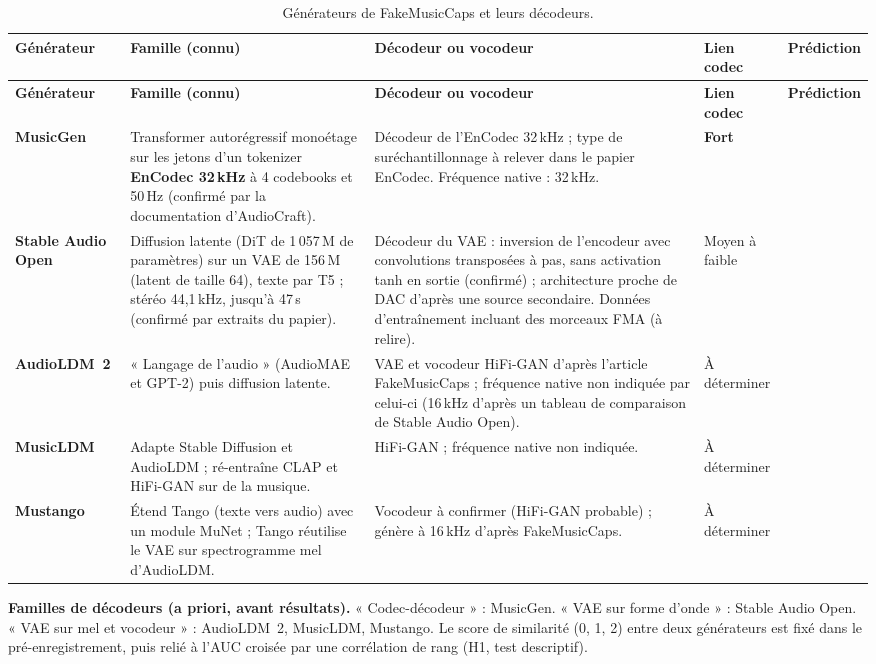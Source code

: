 \documentclass[11pt,a4paper]{article}
\begin{document}
{\small
\begin{longtable}{L{2.2cm}L{4.4cm}L{4.5cm}L{1.7cm}L{1.9cm}}
\caption{Générateurs de FakeMusicCaps et leurs décodeurs.}\label{tab:generateurs}\\
\toprule
\textbf{Générateur} & \textbf{Famille (connu)} & \textbf{Décodeur ou vocodeur} & \textbf{Lien codec} & \textbf{Prédiction}\\
\midrule
\endfirsthead
\toprule
\textbf{Générateur} & \textbf{Famille (connu)} & \textbf{Décodeur ou vocodeur} & \textbf{Lien codec} & \textbf{Prédiction}\\
\midrule
\endhead
\bottomrule
\endfoot
\textbf{MusicGen} & Transformer autorégressif monoétage sur les jetons d'un tokenizer \textbf{EnCodec 32\,kHz} à 4 codebooks et 50\,Hz (confirmé par la documentation d'AudioCraft). & Décodeur de l'EnCodec 32\,kHz ; type de suréchantillonnage à relever dans le papier EnCodec. Fréquence native : 32\,kHz. & \textbf{Fort} & \\
\textbf{Stable Audio Open} & Diffusion latente (DiT de 1\,057\,M de paramètres) sur un VAE de 156\,M (latent de taille 64), texte par T5 ; stéréo 44,1\,kHz, jusqu'à 47\,s (confirmé par extraits du papier). & Décodeur du VAE : inversion de l'encodeur avec convolutions transposées à pas, sans activation tanh en sortie (confirmé) ; architecture proche de DAC d'après une source secondaire. Données d'entraînement incluant des morceaux FMA (à relire). & Moyen à faible & \\
\textbf{AudioLDM~2} & « Langage de l'audio » (AudioMAE et GPT-2) puis diffusion latente. & VAE et vocodeur HiFi-GAN d'après l'article FakeMusicCaps ; fréquence native non indiquée par celui-ci (16\,kHz d'après un tableau de comparaison de Stable Audio Open). & À déterminer & \\
\textbf{MusicLDM} & Adapte Stable Diffusion et AudioLDM ; ré-entraîne CLAP et HiFi-GAN sur de la musique. & HiFi-GAN ; fréquence native non indiquée. & À déterminer & \\
\textbf{Mustango} & Étend Tango (texte vers audio) avec un module MuNet ; Tango réutilise le VAE sur spectrogramme mel d'AudioLDM. & Vocodeur à confirmer (HiFi-GAN probable) ; génère à 16\,kHz d'après FakeMusicCaps. & À déterminer & \\
\end{longtable}
}

\textbf{Familles de décodeurs (a priori, avant résultats).} « Codec-décodeur » : MusicGen. « VAE sur forme d'onde » : Stable Audio Open. « VAE sur mel et vocodeur » : AudioLDM~2, MusicLDM, Mustango. Le score de similarité (0, 1, 2) entre deux générateurs est fixé dans le pré-enregistrement, puis relié à l'AUC croisée par une corrélation de rang (H1, test descriptif).
\end{document}

